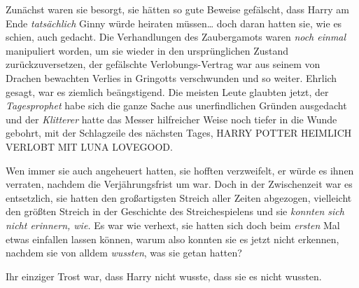 Zunächst waren sie besorgt, sie hätten so gute Beweise gefälscht, dass Harry am Ende \emph{tatsächlich} Ginny würde heiraten müssen… doch daran hatten sie, wie es schien, auch gedacht. Die Verhandlungen des Zaubergamots waren \emph{noch einmal} manipuliert worden, um sie wieder in den ursprünglichen Zustand zurückzuversetzen, der gefälschte Verlobungs-Vertrag war aus seinem von Drachen bewachten Verlies in Gringotts verschwunden und so weiter. Ehrlich gesagt, war es ziemlich beängstigend. Die meisten Leute glaubten jetzt, der \emph{Tagesprophet} habe sich die ganze Sache aus unerfindlichen Gründen ausgedacht und der \emph{Klitterer} hatte das Messer hilfreicher Weise noch tiefer in die Wunde gebohrt, mit der Schlagzeile des nächsten Tages, HARRY POTTER HEIMLICH VERLOBT MIT LUNA LOVEGOOD.

Wen immer sie auch angeheuert hatten, sie hofften verzweifelt, er würde es ihnen verraten, nachdem die Verjährungsfrist um war. Doch in der Zwischenzeit war es entsetzlich, sie hatten den großartigsten Streich aller Zeiten abgezogen, vielleicht den größten Streich in der Geschichte des Streichespielens und sie \emph{konnten sich nicht erinnern, wie.} Es war wie verhext, sie hatten sich doch beim \emph{ersten} Mal etwas einfallen lassen können, warum also konnten sie es jetzt nicht erkennen, nachdem sie von alldem \emph{wussten}, was sie getan hatten?

Ihr einziger Trost war, dass Harry nicht wusste, dass sie es nicht wussten.

